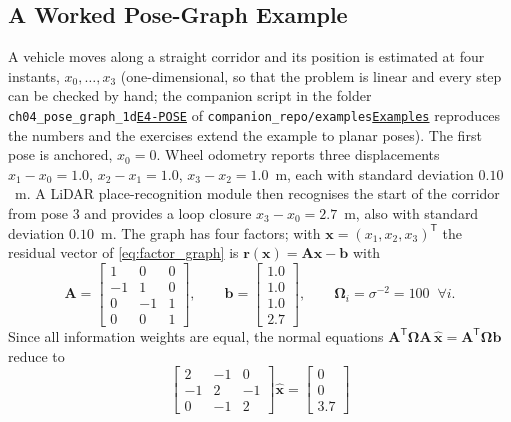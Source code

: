 \documentclass[graybox,envcountchap]{style/SNmono}
\newcommand{\repopath}[1]{\texttt{#1}}
\providecommand{\DIFadd}[1]{{\protect\color{blue} #1}} %
\providecommand{\DIFdel}[1]{{\protect\color{red} #1}} %
\DeclareRobustCommand{\RtwoDel}[1]{{\color{red}%
  \renewcommand{\DIFadd}[1]{##1}\renewcommand{\DIFdel}[1]{##1}%
  #1}}
\DeclareRobustCommand{\RtwoAdd}[1]{{\color{blue}#1}}
\DeclareRobustCommand{\codeentry}[1]{\hyperref[code:#1]{\texttt{#1}}}
\begin{document}
\subsection{A Worked Pose-Graph Example}
\label{subsec:pose-graph-example}
\begin{example}
\label{ex:pose-graph-1d}
A vehicle moves along a straight corridor and its position is estimated at four instants, $x_0,\ldots,x_3$ (one-dimensional, so that the problem is linear and every step can be checked by hand; the companion script in the folder \RtwoDel{\repopath{ch04\_\allowbreak pose\_\allowbreak graph\_\allowbreak 1d}}\RtwoAdd{\codeentry{E4-POSE}} of \RtwoDel{\repopath{companion\_\allowbreak repo/\allowbreak examples}}\RtwoAdd{\codeentry{Examples}} reproduces the numbers and the exercises extend the example to planar poses). The first pose is anchored, $x_0=0$. Wheel odometry reports three displacements $x_1-x_0=1.0$, $x_2-x_1=1.0$, $x_3-x_2=1.0$~m, each with standard deviation $0.10$~m. A LiDAR place-recognition module then recognises the start of the corridor from pose 3 and provides a loop closure $x_3-x_0=2.7$~m, also with standard deviation $0.10$~m. The graph has four factors; with $\mathbf{x}=(x_1,x_2,x_3)^{\mathsf T}$ the residual vector of \eqref{eq:factor_graph} is $\mathbf{r}(\mathbf{x})=\mathbf{A}\mathbf{x}-\mathbf{b}$ with
\begin{equation*}
\mathbf{A}=\begin{bmatrix}1&0&0\\-1&1&0\\0&-1&1\\0&0&1\end{bmatrix},\qquad
\mathbf{b}=\begin{bmatrix}1.0\\1.0\\1.0\\2.7\end{bmatrix},\qquad
\mathbf{\Omega}_i=\sigma^{-2}=100\;\;\forall i .
\end{equation*}
Since all information weights are equal, the normal equations $\mathbf{A}^{\mathsf T}\mathbf{\Omega}\mathbf{A}\,\widehat{\mathbf{x}}=\mathbf{A}^{\mathsf T}\mathbf{\Omega}\mathbf{b}$ reduce to
\begin{equation*}
\begin{bmatrix}2&-1&0\\-1&2&-1\\0&-1&2\end{bmatrix}\widehat{\mathbf{x}}
=\begin{bmatrix}0\\0\\3.7\end{bmatrix}

\end{equation*}
\end{example}
\end{document}

